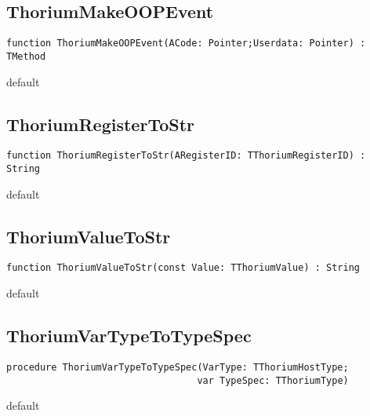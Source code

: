 \subsection{ThoriumMakeOOPEvent}
\label{thoriumcorepkg:thorium:thoriummakeoopevent}
\begin{FPCList}
\Declaration 

\begin{verbatim}
function ThoriumMakeOOPEvent(ACode: Pointer;Userdata: Pointer) : TMethod
\end{verbatim}
\Visibility
default
\end{FPCList}
\subsection{ThoriumRegisterToStr}
\label{thoriumcorepkg:thorium:thoriumregistertostr}
\begin{FPCList}
\Declaration 

\begin{verbatim}
function ThoriumRegisterToStr(ARegisterID: TThoriumRegisterID) : String
\end{verbatim}
\Visibility
default
\end{FPCList}
\subsection{ThoriumValueToStr}
\label{thoriumcorepkg:thorium:thoriumvaluetostr}
\begin{FPCList}
\Declaration 

\begin{verbatim}
function ThoriumValueToStr(const Value: TThoriumValue) : String
\end{verbatim}
\Visibility
default
\end{FPCList}
\subsection{ThoriumVarTypeToTypeSpec}
\label{thoriumcorepkg:thorium:thoriumvartypetotypespec}
\begin{FPCList}
\Declaration 

\begin{verbatim}
procedure ThoriumVarTypeToTypeSpec(VarType: TThoriumHostType;
                                  var TypeSpec: TThoriumType)
\end{verbatim}
\Visibility
default
\end{FPCList}

